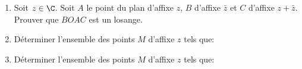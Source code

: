 \begin{exercice}

 \begin{enumerate}
  
  \item Soit $z\in\C$. Soit $A$ le point du plan d'affixe $z$, $B$
  d'affixe $\bar{z}$ et $C$ d'affixe $z+\bar{z}$.
Prouver que $BOAC$ est un losange.
\item D\'eterminer l'ensemble des points $M$ d'affixe $z$ tels que:
\\\noindent%
\item D\'eterminer l'ensemble des points $M$ d'affixe $z$ tels que:
 \\\noindent {}
  \end{enumerate}
\end{exercice}
